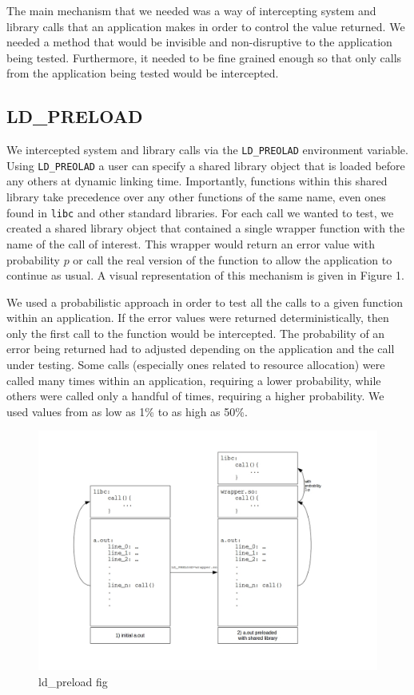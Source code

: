 The main mechanism that we needed was a way of intercepting system and library calls that an application makes in order to control the value returned. We needed a method that would be invisible and non-disruptive to the application being tested. Furthermore, it needed to be fine grained enough so that only calls from the  application being tested would be intercepted.

\subsection{LD\_PRELOAD} \label{ld_preload}
We intercepted system and library calls via the \texttt{LD\_PREOLAD} environment variable. Using \texttt{LD\_PREOLAD} a user can specify a shared library object that is loaded before any others at dynamic linking time. Importantly, functions within this shared library take precedence over any other functions of the same name, even ones found in \texttt{libc} and other standard libraries. For each call we wanted to test, we created a shared library object that contained a single wrapper function with the name of the call of interest. This wrapper would return an error value with probability $p$ or call the real version of the function to allow the application to continue as usual. A visual representation of this mechanism is given in Figure 1.

We used a probabilistic approach in order to test all the calls to a given function within an application. If the error values were returned deterministically, then only the first call to the function would be intercepted. The probability of an error being returned had to adjusted depending on the application and the call under testing. Some calls (especially ones related to resource allocation) were called many times within an application, requiring a lower probability, while others were called only a handful of times, requiring a higher probability. We used values from as low as 1\% to as high as 50\%.

\begin{figure}
	\caption{ld\_preload fig}
	\includegraphics[width=\textwidth]{ldpreload_fig.jpg}
\end{figure}


